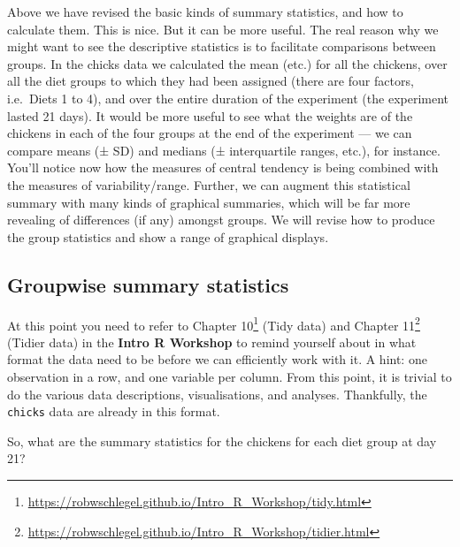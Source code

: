 \documentclass[english,10pt,a4paper,oneside]{book}
\renewcommand{\href}[2]{#2\footnote{\url{#1}}}
\let\rmarkdownfootnote\footnote%
\def\footnote{\protect\rmarkdownfootnote}
\theoremstyle{definition}
\theoremstyle{definition}
\theoremstyle{definition}
\theoremstyle{remark}
\begin{document}
Above we have revised the basic kinds of summary statistics, and how to
calculate them. This is nice. But it can be more useful. The real reason
why we might want to see the descriptive statistics is to facilitate
comparisons between groups. In the chicks data we calculated the mean
(etc.) for all the chickens, over all the diet groups to which they had
been assigned (there are four factors, i.e.~Diets 1 to 4), and over the
entire duration of the experiment (the experiment lasted 21 days). It
would be more useful to see what the weights are of the chickens in each
of the four groups at the end of the experiment --- we can compare means
(± SD) and medians (± interquartile ranges, etc.), for instance. You'll
notice now how the measures of central tendency is being combined with
the measures of variability/range. Further, we can augment this
statistical summary with many kinds of graphical summaries, which will
be far more revealing of differences (if any) amongst groups. We will
revise how to produce the group statistics and show a range of graphical
displays.

\subsection{Groupwise summary
statistics}\label{groupwise-summary-statistics}

At this point you need to refer to
\href{https://robwschlegel.github.io/Intro_R_Workshop/tidy.html}{Chapter
10} (Tidy data) and
\href{https://robwschlegel.github.io/Intro_R_Workshop/tidier.html}{Chapter
11} (Tidier data) in the \textbf{Intro R Workshop} to remind yourself
about in what format the data need to be before we can efficiently work
with it. A hint: one observation in a row, and one variable per column.
From this point, it is trivial to do the various data descriptions,
visualisations, and analyses. Thankfully, the \texttt{chicks} data are
already in this format.

So, what are the summary statistics for the chickens for each diet group
at day 21?
\end{document}
